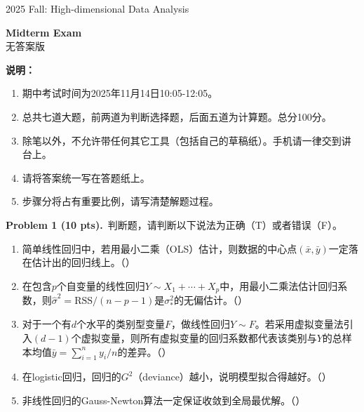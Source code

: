 \documentclass[UTF8,a4paper,11pt,fontset=fandol]{ctexart}
\newcommand{\blank}{\mbox{（\hspace{1.5em}）}}
\newcommand{\problem}[2]{\par\addvspace{10pt}\Needspace{5\baselineskip}\textbf{Problem #1 (#2 pts).}\ }
\newcommand{\examheader}[2]{%
  {\large #1 Fall: High-dimensional Data Analysis}\par
  \vspace{6pt}
  \begin{center}{\Large\bfseries #2}\\[3pt]{\small 无答案版}\end{center}
  \vspace{2pt}}
\begin{document}
\examheader{2025}{Midterm Exam}
\textbf{说明：}
\begin{enumerate}[label=\arabic*.,itemsep=3pt]
  \item 期中考试时间为2025年11月14日10:05-12:05。
  \item 总共七道大题，前两道为判断选择题，后面五道为计算题。总分100分。
  \item 除笔以外，不允许带任何其它工具（包括自己的草稿纸）。手机请一律交到讲台上。
  \item 请将答案统一写在答题纸上。
  \item 步骤分将占有重要比例，请写清楚解题过程。
\end{enumerate}

\problem{1}{10}判断题，请判断以下说法为正确（T）或者错误（F）。
\begin{enumerate}
  \item 简单线性回归中，若用最小二乘（OLS）估计，则数据的中心点$(\bar x,\bar y)$一定落在估计出的回归线上。\blank
  \item 在包含$p$个自变量的线性回归$Y\sim X_1+\cdots+X_p$中，用最小二乘法估计回归系数，则$\widehat\sigma^2=\mathrm{RSS}/(n-p-1)$是$\sigma_*^2$的无偏估计。\blank
  \item 对于一个有$d$个水平的类别型变量$F$，做线性回归$Y\sim F$。若采用虚拟变量法引入$(d-1)$个虚拟变量，则所有虚拟变量的回归系数都代表该类别与$Y$的总样本均值$\bar y=\sum_{i=1}^n y_i/n$的差异。\blank
  \item 在logistic回归，回归的$G^2$（deviance）越小，说明模型拟合得越好。\blank
  \item 非线性回归的Gauss-Newton算法一定保证收敛到全局最优解。\blank
\end{enumerate}
\end{document}
